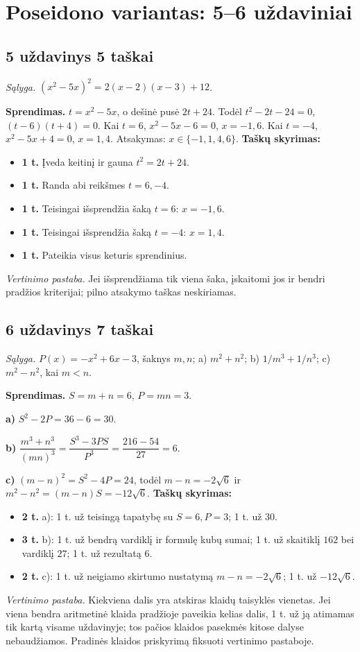 \documentclass[11pt,a4paper]{article}
\newcommand{\uzd}[3]{\subsection*{#1 uždavinys \hfill #2 taškai}\textit{Sąlyga.} #3\par}
\newcommand{\kriterijai}{\textbf{Taškų skyrimas:}}
\newcommand{\balas}[2]{\item \textbf{#1 t.} #2}
\begin{document}
\section*{Poseidono variantas: 5--6 uždaviniai}
\uzd{5}{5}{$(x^2-5x)^2=2(x-2)(x-3)+12$.}
\textbf{Sprendimas.} $t=x^2-5x$, o dešinė pusė $2t+24$. Todėl $t^2-2t-24=0$, $(t-6)(t+4)=0$. Kai $t=6$, $x^2-5x-6=0$, $x=-1,6$. Kai $t=-4$, $x^2-5x+4=0$, $x=1,4$. Atsakymas: $x\in\{-1,1,4,6\}$.
\kriterijai\begin{itemize}
\balas{1}{Įveda keitinį ir gauna $t^2=2t+24$.}
\balas{1}{Randa abi reikšmes $t=6,-4$.}
\balas{1}{Teisingai išsprendžia šaką $t=6$: $x=-1,6$.}
\balas{1}{Teisingai išsprendžia šaką $t=-4$: $x=1,4$.}
\balas{1}{Pateikia visus keturis sprendinius.}
\end{itemize}
\textit{Vertinimo pastaba.} Jei išsprendžiama tik viena šaka, įskaitomi jos ir bendri pradžios kriterijai; pilno atsakymo taškas neskiriamas.
\uzd{6}{7}{$P(x)=-x^2+6x-3$, šaknys $m,n$; a) $m^2+n^2$; b) $1/m^3+1/n^3$; c) $m^2-n^2$, kai $m<n$.}
\textbf{Sprendimas.} $S=m+n=6$, $P=mn=3$.\par\textbf{a)} $S^2-2P=36-6=30$.\par\textbf{b)} $\dfrac{m^3+n^3}{(mn)^3}=\dfrac{S^3-3PS}{P^3}=\dfrac{216-54}{27}=6$.\par\textbf{c)} $(m-n)^2=S^2-4P=24$, todėl $m-n=-2\sqrt6$ ir $m^2-n^2=(m-n)S=-12\sqrt6$.
\kriterijai\begin{itemize}
\balas{2}{a): 1 t. už teisingą tapatybę su $S=6,P=3$; 1 t. už $30$.}
\balas{3}{b): 1 t. už bendrą vardiklį ir formulę kubų sumai; 1 t. už skaitiklį $162$ bei vardiklį $27$; 1 t. už rezultatą $6$.}
\balas{2}{c): 1 t. už neigiamo skirtumo nustatymą $m-n=-2\sqrt6$; 1 t. už $-12\sqrt6$.}
\end{itemize}
\textit{Vertinimo pastaba.} Kiekviena dalis yra atskiras klaidų taisyklės vienetas. Jei viena bendra aritmetinė klaida pradžioje paveikia kelias dalis, 1 t. už ją atimamas tik kartą visame uždavinyje; tos pačios klaidos pasekmės kitose dalyse nebaudžiamos. Pradinės klaidos priskyrimą fiksuoti vertinimo pastaboje.
\newpage
\end{document}
